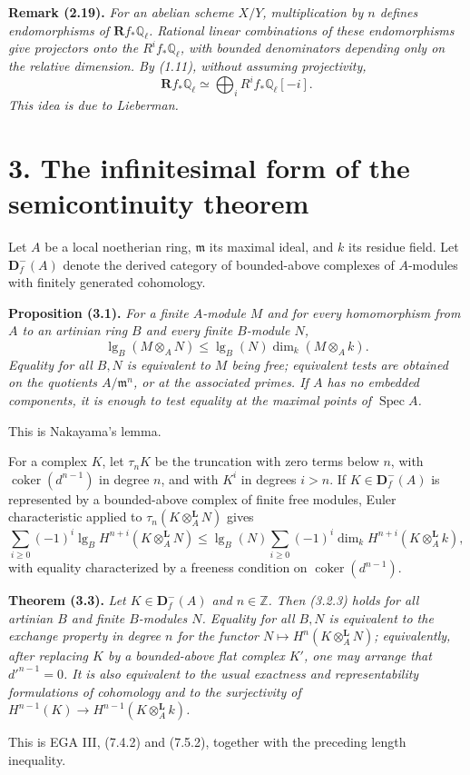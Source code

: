 \documentclass[11pt]{article}
\DeclareMathOperator{\Spec}{Spec}
\DeclareMathOperator{\coker}{coker}
\newcommand{\bD}{\mathbf D}
\newcommand{\bR}{\mathbf R}
\newcommand{\Z}{\mathbb Z}
\newcommand{\Ql}{\mathbb Q_\ell}
\newcommand{\length}{\operatorname{lg}}
\newenvironment{named}[1]{\par\medskip\noindent\textbf{#1}\itshape}{\par\medskip}
\begin{document}
\begin{named}{Remark (2.19).}
For an abelian scheme $X/Y$, multiplication by $n$ defines endomorphisms of $\bR f_*\Ql$. Rational linear combinations of these endomorphisms give projectors onto the $R^if_*\Ql$, with bounded denominators depending only on the relative dimension. By (1.11), without assuming projectivity,
\[
\bR f_*\Ql\simeq\bigoplus_iR^if_*\Ql[-i].
\]
This idea is due to Lieberman.
\end{named}

\section*{3. The infinitesimal form of the semicontinuity theorem}
Let $A$ be a local noetherian ring, $\mathfrak m$ its maximal ideal, and $k$ its residue field. Let $\bD^-_f(A)$ denote the derived category of bounded-above complexes of $A$-modules with finitely generated cohomology.

\begin{named}{Proposition (3.1).}
For a finite $A$-module $M$ and for every homomorphism from $A$ to an artinian ring $B$ and every finite $B$-module $N$,
\[
\length_B(M\otimes_AN)\le \length_B(N)\dim_k(M\otimes_Ak).
\]
Equality for all $B,N$ is equivalent to $M$ being free; equivalent tests are obtained on the quotients $A/\mathfrak m^n$, or at the associated primes. If $A$ has no embedded components, it is enough to test equality at the maximal points of $\Spec A$.
\end{named}
This is Nakayama's lemma.

For a complex $K$, let $\tau_nK$ be the truncation with zero terms below $n$, with $\coker(d^{n-1})$ in degree $n$, and with $K^i$ in degrees $i>n$. If $K\in\bD^-_f(A)$ is represented by a bounded-above complex of finite free modules, Euler characteristic applied to $\tau_n(K\otimes_A^\mathbf L N)$ gives
\begin{equation}\tag{3.2.3}
\sum_{i\ge0}(-1)^i\length_BH^{n+i}(K\otimes_A^\mathbf L N)
\le\length_B(N)\sum_{i\ge0}(-1)^i\dim_kH^{n+i}(K\otimes_A^\mathbf L k),
\end{equation}
with equality characterized by a freeness condition on $\coker(d^{n-1})$.

\begin{named}{Theorem (3.3).}
Let $K\in\bD^-_f(A)$ and $n\in\Z$. Then (3.2.3) holds for all artinian $B$ and finite $B$-modules $N$. Equality for all $B,N$ is equivalent to the exchange property in degree $n$ for the functor $N\mapsto H^n(K\otimes_A^\mathbf LN)$; equivalently, after replacing $K$ by a bounded-above flat complex $K'$, one may arrange that $d'^{n-1}=0$. It is also equivalent to the usual exactness and representability formulations of cohomology and to the surjectivity of $H^{n-1}(K)\to H^{n-1}(K\otimes_A^\mathbf Lk)$.
\end{named}
This is EGA III, (7.4.2) and (7.5.2), together with the preceding length inequality.
\end{document}
